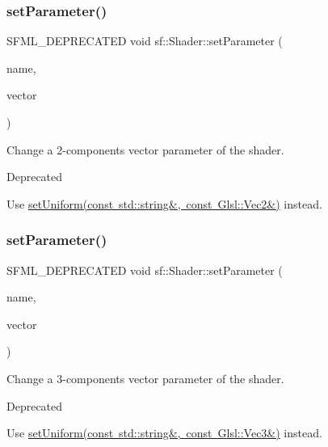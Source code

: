 \subsubsection{\texorpdfstring{setParameter()}{setParameter()}\hspace{0.1cm}{\footnotesize\ttfamily [5/10]}}
{\footnotesize\ttfamily S\+F\+M\+L\+\_\+\+D\+E\+P\+R\+E\+C\+A\+T\+ED void sf\+::\+Shader\+::set\+Parameter (\begin{DoxyParamCaption}\item[{const std\+::string \&}]{name,  }\item[{const \mbox{\hyperlink{classsf_1_1_vector2}{Vector2f}} \&}]{vector }\end{DoxyParamCaption})}



Change a 2-\/components vector parameter of the shader. 

\begin{DoxyRefDesc}{Deprecated}
\item[\mbox{\hyperlink{deprecated__deprecated000010}{Deprecated}}]Use \mbox{\hyperlink{classsf_1_1_shader_a4a2c673c41e37b17d67e4af1298b679f}{set\+Uniform(const std\+::string\&, const Glsl\+::\+Vec2\&)}} instead. \end{DoxyRefDesc}
\begin{DoxyVerb}\end{DoxyVerb}
 \mbox{\label{classsf_1_1_shader_abf1eb5e74f216c7bcfaf34d08c960ee0}} 
\subsubsection{\texorpdfstring{setParameter()}{setParameter()}\hspace{0.1cm}{\footnotesize\ttfamily [6/10]}}
{\footnotesize\ttfamily S\+F\+M\+L\+\_\+\+D\+E\+P\+R\+E\+C\+A\+T\+ED void sf\+::\+Shader\+::set\+Parameter (\begin{DoxyParamCaption}\item[{const std\+::string \&}]{name,  }\item[{const \mbox{\hyperlink{classsf_1_1_vector3}{Vector3f}} \&}]{vector }\end{DoxyParamCaption})}



Change a 3-\/components vector parameter of the shader. 

\begin{DoxyRefDesc}{Deprecated}
\item[\mbox{\hyperlink{deprecated__deprecated000011}{Deprecated}}]Use \mbox{\hyperlink{classsf_1_1_shader_aad654ad8de6f0c56191fa7b8cea21db2}{set\+Uniform(const std\+::string\&, const Glsl\+::\+Vec3\&)}} instead. \end{DoxyRefDesc}
\begin{DoxyVerb}\end{DoxyVerb}
 \mbox{\label{classsf_1_1_shader_a66e68e64c06ef5501e50dd5903cab51c}} 
